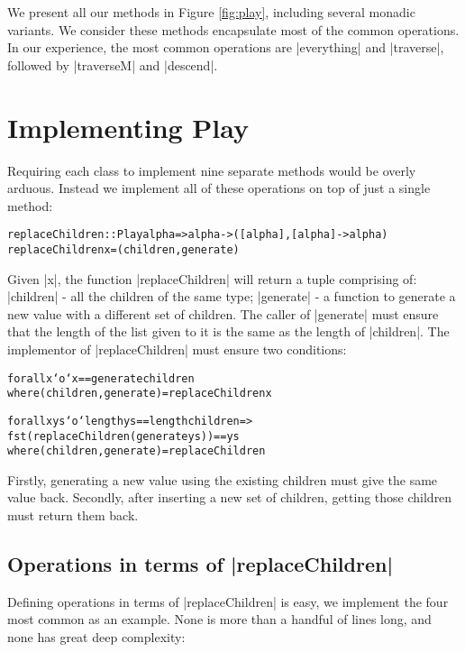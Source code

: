 \documentclass[preprint]{sigplanconf}
\newenvironment{code}{\begin{alltt}\small}{\end{alltt}}
\begin{document}
We present all our methods in Figure \ref{fig:play}, including several monadic variants. We consider these methods encapsulate most of the common operations. In our experience, the most common operations are |everything| and |traverse|, followed by |traverseM| and |descend|.


\section{Implementing Play}
\label{sec:implement_play}

Requiring each class to implement nine separate methods would be overly arduous. Instead we implement all of these operations on top of just a single method:

\begin{code}
replaceChildren :: Play alpha => alpha -> ([alpha], [alpha] -> alpha)
replaceChildren x = (children,generate)
\end{code}

Given |x|, the function |replaceChildren| will return a tuple comprising of: |children| - all the children of the same type; |generate| - a function to generate a new value with a different set of children. The caller of |generate| must ensure that the length of the list given to it is the same as the length of |children|. The implementor of |replaceChildren| must ensure two conditions:

\begin{code}
forall x `o` x == generate children
    where (children,generate) = replaceChildren x

forall x ys `o`  length ys == length children =>
                 fst (replaceChildren (generate ys)) == ys
    where (children,generate) = replaceChildren
\end{code}

Firstly, generating a new value using the existing children must give the same value back. Secondly, after inserting a new set of children, getting those children must return them back.


\subsection{Operations in terms of |replaceChildren|}

Defining operations in terms of |replaceChildren| is easy, we implement the four most common as an example. None is more than a handful of lines long, and none has great deep complexity:
\end{document}
